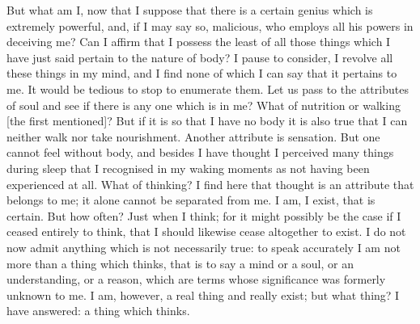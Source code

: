 But what am I, now that I suppose that there is a certain genius which
is extremely powerful, and, if I may say so, malicious, who employs
all his powers in deceiving me? Can I affirm that I possess the least
of all those things which I have just said pertain to the nature of
body? I pause to consider, I revolve all these things in my mind, and
I find none of which I can say that it pertains to me. It would be
tedious to stop to enumerate them. Let us pass to the attributes of
soul and see if there is any one which is in me? What of nutrition or
walking [the first mentioned]? But if it is so that I have no body it
is also true that I can neither walk nor take nourishment. Another
attribute is sensation. But one cannot feel without body, and besides
I have thought I perceived many things during sleep that I recognised
in my waking moments as not having been experienced at all. What of
thinking? I find here that thought is an attribute that belongs to me;
it alone cannot be separated from me. I am, I exist, that is certain.
But how often? Just when I think; for it might possibly be the case if
I ceased  entirely to think, that I should likewise cease
altogether to exist. I do not now admit anything which is not
necessarily true: to speak accurately I am not more than a thing which
thinks, that is to say a mind or a soul, or an understanding, or a
reason, which are terms whose significance was formerly unknown to me.
I am, however, a real thing and really exist; but what thing? I have
answered: a thing which thinks.

